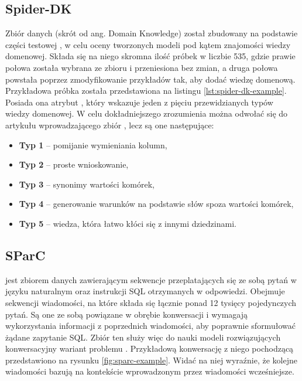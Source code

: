 \subsection{Spider-DK}
Zbiór danych   (skrót od ang. Domain Knowledge) został zbudowany na podstawie części testowej , w celu oceny tworzonych modeli pod kątem znajomości wiedzy domenowej. Składa się na niego skromna ilość próbek w liczbie 535, gdzie prawie połowa została wybrana ze zbioru  i przeniesiona bez zmian, a druga połowa powstała poprzez zmodyfikowanie przykładów tak, aby dodać wiedzę domenową. Przykładowa próbka została przedstawiona na listingu \ref{lst:spider-dk-example}. Posiada ona atrybut , który wskazuje jeden z pięciu przewidzianych typów wiedzy domenowej. W celu dokładniejszego zrozumienia można odwołać się do artykułu wprowadzającego zbiór , lecz są one następujące:
\begin{itemize}
    \item \textbf{Typ 1} -- pomijanie wymieniania kolumn,
    \item \textbf{Typ 2} -- proste wnioskowanie,
    \item \textbf{Typ 3} -- synonimy wartości komórek,
    \item \textbf{Typ 4} -- generowanie warunków na podstawie słów spoza wartości komórek,
    \item \textbf{Typ 5} -- wiedza, która łatwo kłóci się z innymi dziedzinami.
\end{itemize}

\begin{minipage}{\linewidth}

\end{minipage}

\subsection{SParC}
  jest zbiorem danych zawierającym sekwencje przeplatających się ze sobą pytań w języku naturalnym oraz instrukcji SQL otrzymanych w odpowiedzi. Obejmuje  sekwencji wiadomości, na które składa się łącznie ponad 12 tysięcy pojedynczych pytań. Są one ze sobą powiązane w obrębie konwersacji i wymagają wykorzystania informacji z poprzednich wiadomości, aby poprawnie sformułować żądane zapytanie SQL. Zbiór ten służy więc do nauki modeli rozwiązujących konwersacyjny wariant problemu . Przykładową konwersację z niego pochodzącą przedstawiono na rysunku \ref{fig:sparc-example}. Widać na niej wyraźnie, że kolejne wiadomości bazują na kontekście wprowadzonym przez wiadomości wcześniejsze.

